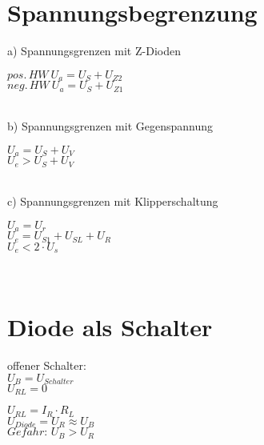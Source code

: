 \section{Spannungsbegrenzung}\label{sec:spannungsbegrenzung}
    a) Spannungsgrenzen mit Z-Dioden\\
    \begin{minipage}{0.4\columnwidth}
        $pos.\, HW\: U_a=U_S+U_{Z2}$\\
        $neg.\, HW\: U_a=U_S+U_{Z1}$\\
    \end{minipage}
    \begin{minipage}{0.4\columnwidth}
    \end{minipage}\\
    b) Spannungsgrenzen mit Gegenspannung\\
    \begin{minipage}{0.4\columnwidth}
        $U_a=U_S+U_V$\\
        $U_e>U_S+U_V$\\
    \end{minipage}
    \begin{minipage}{0.4\columnwidth}
    \end{minipage}\\
    c) Spannungsgrenzen mit Klipperschaltung\\
    \begin{minipage}{0.4\columnwidth}
        $U_a=U_r$\\
        $U_e=U_{S1}+U_{SL}+U_R$\\
        $U_e<2\cdot U_s$\\
    \end{minipage}
    \begin{minipage}{0.4\columnwidth}
    \end{minipage}\\
    \pagebreak %

\section{Diode als Schalter}
    \begin{minipage}{0.2\columnwidth}
        offener Schalter:\\
        $U_B=U_{Schalter}$\\
        $U_{RL}=0$
    \end{minipage}
    \begin{minipage}{0.5\columnwidth}
    \end{minipage}
    \begin{minipage}{0.3\columnwidth}
        $U_{RL}=I_R\cdot R_L$\\
        $U_{Diode}=U_R\approx U_B$\\
        $Gefahr:\, U_B>U_R$
    \end{minipage}

